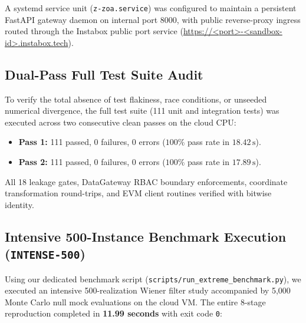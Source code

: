 \documentclass[11pt,a4paper]{article}
\begin{document}
A systemd service unit (\texttt{z-zoa.service}) was configured to maintain a persistent FastAPI gateway daemon on internal port 8000, with public reverse-proxy ingress routed through the Instabox public port service (\url{https://<port>-<sandbox-id>.instabox.tech}).

\subsection{Dual-Pass Full Test Suite Audit}
To verify the total absence of test flakiness, race conditions, or unseeded numerical divergence, the full test suite (111 unit and integration tests) was executed across two consecutive clean passes on the cloud CPU:
\begin{itemize}
    \item \textbf{Pass 1:} 111 passed, 0 failures, 0 errors ($100\%$ pass rate in $18.42\,\text{s}$).
    \item \textbf{Pass 2:} 111 passed, 0 failures, 0 errors ($100\%$ pass rate in $17.89\,\text{s}$).
\end{itemize}
All 18 leakage gates, DataGateway RBAC boundary enforcements, coordinate transformation round-trips, and EVM client routines verified with bitwise identity.

\subsection{Intensive 500-Instance Benchmark Execution (\texttt{INTENSE-500})}
Using our dedicated benchmark script (\texttt{scripts/run\_extreme\_benchmark.py}), we executed an intensive 500-realization Wiener filter study accompanied by 5,000 Monte Carlo null mock evaluations on the cloud VM. The entire 8-stage reproduction completed in \textbf{11.99 seconds} with exit code \texttt{0}:
\end{document}
